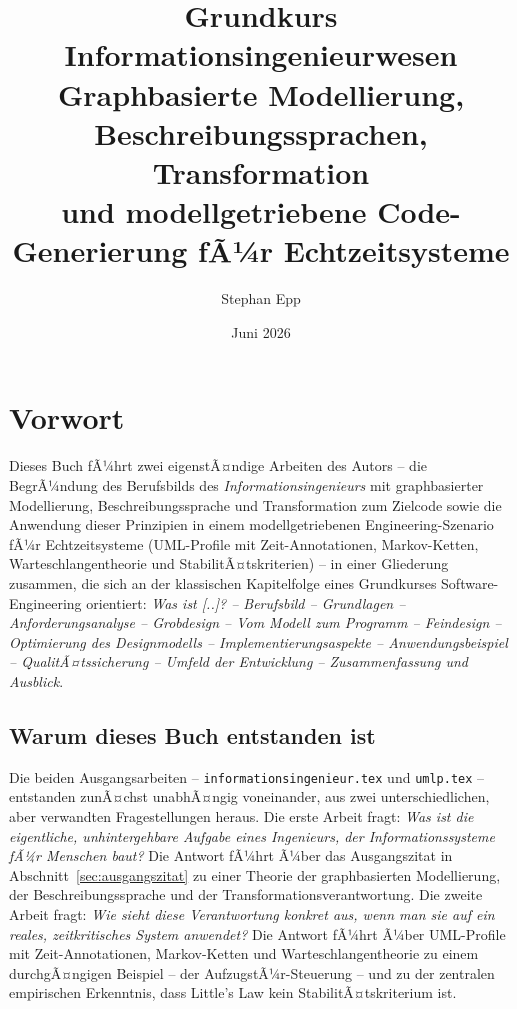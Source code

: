 ﻿\documentclass[a4paper,12pt]{report}
\title{\textbf{Grundkurs Informationsingenieurwesen}\\[0.5em]
\large Graphbasierte Modellierung, Beschreibungssprachen, Transformation\\
und modellgetriebene Code-Generierung fÃ¼r Echtzeitsysteme}
\author{Stephan Epp}
\date{Juni 2026}
\theoremstyle{definition}
\begin{document}
\sloppy

\maketitle

\tableofcontents

\chapter*{Vorwort}

Dieses Buch fÃ¼hrt zwei eigenstÃ¤ndige Arbeiten des Autors -- die BegrÃ¼ndung
des Berufsbilds des \emph{Informationsingenieurs} mit graphbasierter
Modellierung, Beschreibungssprache und Transformation zum Zielcode sowie
die Anwendung dieser Prinzipien in einem modellgetriebenen
Engineering-Szenario fÃ¼r Echtzeitsysteme (UML-Profile mit
Zeit-Annotationen, Markov-Ketten, Warteschlangentheorie und
StabilitÃ¤tskriterien) -- in einer Gliederung zusammen, die sich an der
klassischen Kapitelfolge eines Grundkurses Software-Engineering
orientiert: \emph{Was ist [..]? -- Berufsbild -- Grundlagen --
Anforderungsanalyse -- Grobdesign -- Vom Modell zum Programm --
Feindesign -- Optimierung des Designmodells -- Implementierungsaspekte --
Anwendungsbeispiel -- QualitÃ¤tssicherung -- Umfeld der Entwicklung --
Zusammenfassung und Ausblick}.

\section*{Warum dieses Buch entstanden ist}

Die beiden Ausgangsarbeiten -- \texttt{informationsingenieur.tex} und
\texttt{umlp.tex} -- entstanden zunÃ¤chst unabhÃ¤ngig voneinander, aus zwei
unterschiedlichen, aber verwandten Fragestellungen heraus. Die erste Arbeit
fragt: \emph{Was ist die eigentliche, unhintergehbare Aufgabe eines
Ingenieurs, der Informationssysteme fÃ¼r Menschen baut?} Die Antwort fÃ¼hrt
Ã¼ber das Ausgangszitat in Abschnitt~\ref{sec:ausgangszitat} zu einer
Theorie der graphbasierten Modellierung, der Beschreibungssprache und der
Transformationsverantwortung. Die zweite Arbeit fragt: \emph{Wie sieht diese
Verantwortung konkret aus, wenn man sie auf ein reales, zeitkritisches
System anwendet?} Die Antwort fÃ¼hrt Ã¼ber UML-Profile mit
Zeit-Annotationen, Markov-Ketten und Warteschlangentheorie zu einem
durchgÃ¤ngigen Beispiel -- der AufzugstÃ¼r-Steuerung -- und zu der zentralen
empirischen Erkenntnis, dass Little's Law kein StabilitÃ¤tskriterium ist.
\end{document}
